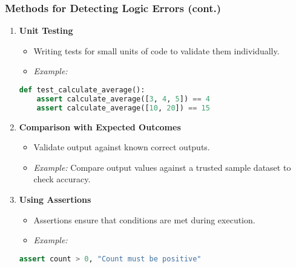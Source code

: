 \documentclass[aspectratio=169]{beamer}
\begin{document}
\begin{frame}[fragile]
    \frametitle{Methods for Detecting Logic Errors (cont.)}
    \begin{enumerate}[resume]
        \item \textbf{Unit Testing}
        \begin{itemize}
            \item Writing tests for small units of code to validate them individually.
            \item \textit{Example:}
            \end{itemize}
            \begin{lstlisting}[language=Python]
def test_calculate_average():
    assert calculate_average([3, 4, 5]) == 4
    assert calculate_average([10, 20]) == 15
            \end{lstlisting}

        \item \textbf{Comparison with Expected Outcomes}
        \begin{itemize}
            \item Validate output against known correct outputs.
            \item \textit{Example:} Compare output values against a trusted sample dataset to check accuracy.
        \end{itemize}

        \item \textbf{Using Assertions}
        \begin{itemize}
            \item Assertions ensure that conditions are met during execution.
            \item \textit{Example:} 
            \end{itemize}
            \begin{lstlisting}[language=Python]
assert count > 0, "Count must be positive"
            \end{lstlisting}
    \end{enumerate}
\end{frame}
\end{document}
